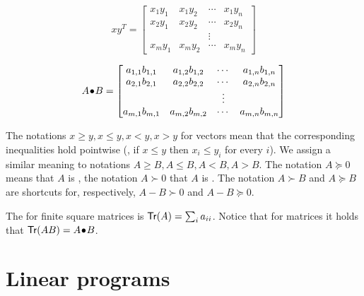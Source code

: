 \documentclass[a4paper,justified]{tufte-handout}
\begin{document}
\begin{figure*}
\begin{minipage}[b]{0.45\textwidth}
\begin{equation*}
  xy^{T}=\begin{bmatrix}
  x_{1}y_{1} & x_{1}y_{2} & \cdots & x_{1}y_{n} \\
  x_{2}y_{1} & x_{2}y_{2} & \cdots & x_{2}y_{n} \\
  & & \vdots & \\
  x_{m}y_{1} & x_{m}y_{2} & \cdots & x_{m}y_{n}
\end{bmatrix}
\end{equation*}
\end{minipage}
\begin{minipage}[b]{0.45\textwidth}
  \begin{equation*}
    {A}\!\bullet\!{B}=\begin{bmatrix}
      a_{1,1}b_{1,1} & a_{1,2}b_{1,2} & \cdots & a_{1,n}b_{1,n} \\
      a_{2,1}b_{2,1} & a_{2,2}b_{2,2} & \cdots & a_{2,n}b_{2,n} \\
      & & \vdots & \\
      a_{m,1}b_{m,1} & a_{m,2}b_{m,2} & \cdots & a_{m,n}b_{m,n}
    \end{bmatrix}
  \end{equation*} 
\end{minipage}
\end{figure*}

The notations $ x \geq y, x \leq y, x < y, x > y$ for vectors mean
that the corresponding inequalities hold pointwise (\ie, if $ x \leq y
$ then $ x_{i} \leq y_{i} $ for every $ i $). We assign a similar
meaning to notations $ A \geq B, A \leq B, A < B, A > B$.
%
The notation $ A \succeq 0 $ means that $ A $ is
, the notation $ A \succ 0 $ that
$ A $ is . The notation $ A \succ B $
and $ A \succeq B$ are shortcuts for, respectively,  $ A - B \succ 0$
and $  A - B \succeq 0$.

The  for finite square matrices is $
\mathsf{Tr}(A) = \sum_{i}a_{ii} $. Notice that for 
matrices it holds that $ \mathsf{Tr}(AB)={A}\!\bullet\!{B} $.




\section{Linear programs}
\end{document}
